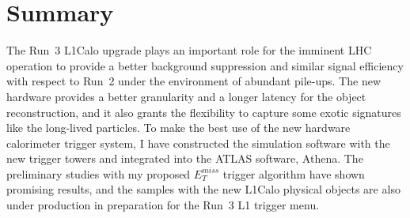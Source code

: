 \section{Summary}
The Run~3 L1Calo upgrade plays an important role for the imminent LHC operation to provide a better background suppression and similar signal efficiency with respect to Run~2 under the environment of abundant pile-ups. The new hardware provides a better granularity and a longer latency for the object reconstruction, and it also grants the flexibility to capture some exotic signatures like the long-lived particles. To make the best use of the new hardware calorimeter trigger system, I have constructed the simulation software with the new trigger towers and integrated into the ATLAS software, Athena. The preliminary studies with my proposed $E^{miss}_{T}$ trigger algorithm have shown promising results, and the samples with the new L1Calo physical objects are also under production in preparation for the Run~3 L1 trigger menu. 